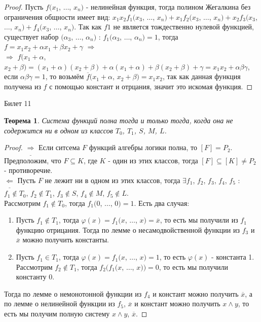 \documentclass[a4paper, 12pt]{article}
\renewcommand{\phi}{\varphi}
\theoremstyle{definition}
\theoremstyle{plain}
\newtheorem*{theorem}{Теорема}
\theoremstyle{remark}
\begin{document}
  \begin{proof}
    Пусть $f(x_1$, $\ldots$, $x_n)$ - нелинейная функция, тогда полином Жегалкина без ограничения общности имеет вид: $x_1x_2f_1(x_3$, $\ldots$, $x_n)+x_1f_2(x_3$, $\ldots$, $x_n)+x_2f_3(x_3$, $\ldots$, $x_n)+f_4(x_3$, $\ldots$, $x_n)$. Так как $f1$ не является тождественно нулевой функцией, существует набор $(\alpha_3$, $\ldots$, $\alpha_n)$ : $f_1(\alpha_3$, $\ldots$, $\alpha_n)=1$, тогда $f=x_1x_2+\alpha x_1+\beta x_2+\gamma$ $\Longrightarrow$\\
    $\Longrightarrow$ $f(x_1+\alpha$, $x_2+\beta)=(x_1+\alpha)(x_2+\beta)+\alpha(x_1+\alpha)+\beta(x_2+\beta)+\gamma=x_1x_2+\alpha\beta\gamma$, если $\alpha\beta\gamma=1$, то возьмём $\overline{f}(x_1+\alpha$, $x_2+\beta)=x_1x_2$,  так как данная функция получена из $f$ с помощью констант и отрцания, значит это искомая функция.
  \end{proof}
  \begin{center}
    Билет 11
  \end{center}
  \begin{theorem}
    Система функций полна тогда и только тогда, когда она не содержится ни в одном из классов $T_0$, $T_1$, $S$, $M$, $L$.
  \end{theorem}
  \begin{proof}
    $\underline{\Longrightarrow}$ Если ситсема $F$ функций алгебры логики полна, то $[F]=P_2$. Предположим, что $F\subseteq K$, где $K$ - один из этих классов, тогда $[F]\subseteq[K]\neq P_2$ - противоречие.\\
    $\underline{\Longleftarrow}$ Пусть $F$ не лежит ни в одном из этих классов, тогда $\exists f_1$, $f_2$, $f_3$, $f_4$, $f_5$ : $f_1\notin T_0$, $f_2\notin T_1$, $f_3\notin S$, $f_4\notin M$, $f_5\notin L$.\\
    Рассмотрим $f_1\notin T_0$, тогда $f_1(0$, $\ldots$, $0)=1$. Есть два случая:
    \begin{enumerate}
      \item Пусть $f_1\notin T_1$, тогда $\phi(x)=f_1(x$, $\ldots$, $x)=\overline{x}$, то есть мы получили из $f_1$ функцию отрицания. Тогда по лемме о несамодвойственной функции из $f_3$ и $\overline{x}$ можно получить константы.
      \item Пусть $f_1\in T_1$, тогда $\phi(x)=f_1(x$, $\ldots$, $x)=1$, то есть $\phi(x)$ - константа 1. Рассмотрим $f_2\notin T_1$, тогда $f_2(f_1(x$, $\ldots$, $x))=0$, то есть мы получили константу 0.
    \end{enumerate}
    Тогда по лемме о немонотонной функции из $f_4$ и констант можно получить $\overline{x}$, а по лемме о нелинейной функции из $f_5$, $\overline{x}$ и констант можно получить $x\wedge y$, то есть мы получим полную систему {$x\wedge y$, $\overline{x}$}.
  \end{proof}
\end{document}
